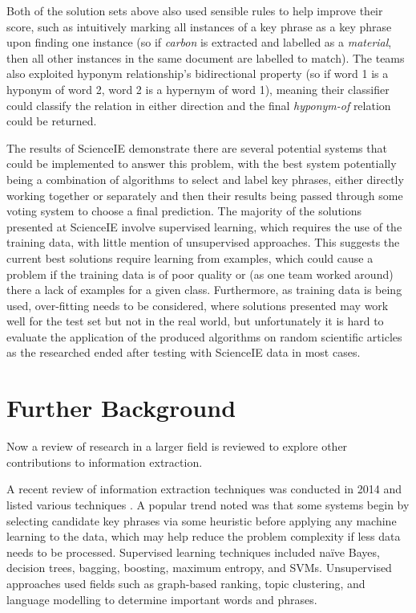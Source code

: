 Both of the solution sets above also used sensible rules to help improve their score, such as intuitively marking all instances of a key phrase as a key phrase upon finding one instance (so if \textit{carbon} is extracted and labelled as a \textit{material}, then all other instances in the same document are labelled to match). The teams also exploited hyponym relationship’s bidirectional property (so if word 1 is a hyponym of word 2, word 2 is a hypernym of word 1), meaning their classifier could classify the relation in either direction and the final \textit{hyponym-of} relation could be returned.

The results of ScienceIE demonstrate there are several potential systems that could be implemented to answer this problem, with the best system potentially being a combination of algorithms to select and label key phrases, either directly working together or separately and then their results being passed through some voting system to choose a final prediction. The majority of the solutions presented at ScienceIE involve supervised learning, which requires the use of the training data, with little mention of unsupervised approaches. This suggests the current best solutions require learning from examples, which could cause a problem if the training data is of poor quality or (as one team worked around) there a lack of examples for a given class. Furthermore, as training data is being used, over-fitting needs to be considered, where solutions presented may work well for the test set but not in the real world, but unfortunately it is hard to evaluate the application of the produced algorithms on random scientific articles as the researched ended after testing with ScienceIE data in most cases.

\section{Further Background}
Now a review of research in a larger field is reviewed to explore other contributions to information extraction.

A recent review of information extraction techniques was conducted in 2014 and listed various techniques \cite{Hasan2014}. A popular trend noted was that some systems begin by selecting candidate key phrases via some heuristic before applying any machine learning to the data, which may help reduce the problem complexity if less data needs to be processed. Supervised learning techniques included naïve Bayes, decision trees, bagging, boosting, maximum entropy, and SVMs. Unsupervised approaches used fields such as graph-based ranking, topic clustering, and language modelling to determine important words and phrases. 

